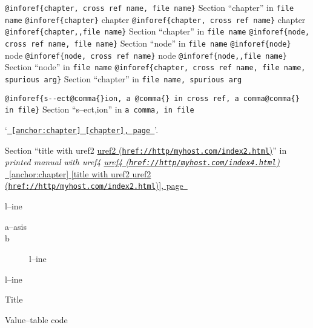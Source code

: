 \documentclass{book}
\begin{document}
\begin{titlepage}
\texttt{@inforef\{chapter, cross ref name, file name\}} Section ``chapter'' in \texttt{file name}
\texttt{@inforef\{chapter\}} chapter
\texttt{@inforef\{chapter, cross ref name\}} chapter
\texttt{@inforef\{chapter,,file name\}} Section ``chapter'' in \texttt{file name}
\texttt{@inforef\{node, cross ref name, file name\}} Section ``node'' in \texttt{file name}
\texttt{@inforef\{node\}} node
\texttt{@inforef\{node, cross ref name\}} node
\texttt{@inforef\{node,,file name\}} Section ``node'' in \texttt{file name}
\texttt{@inforef\{chapter, cross ref name, file name, spurious arg\}} Section ``chapter'' in \texttt{file name, spurious arg}

\texttt{@inforef\{s{-}{-}ect@comma\{\}ion, a @comma\{\} in cross
ref, a comma@comma\{\} in file\}}
Section ``s--ect,ion'' in \texttt{a comma, in file}

`\texttt{\hyperref[anchor:chapter]{\chaptername~\ref*{anchor:chapter} [chapter], page~\pageref*{anchor:chapter}}}'.

Section ``title with uref2 \href{href://http/myhost.com/index2.html}{uref2 (\nolinkurl{href://http/myhost.com/index2.html})}'' in \textit{printed manual with uref4 \href{href://http/myhost.com/index4.html}{uref4 (\nolinkurl{href://http/myhost.com/index4.html})}}
\hyperref[anchor:chapter]{\chaptername~\ref*{anchor:chapter} [title with uref2 \href{href://http/myhost.com/index2.html}{uref2 (\nolinkurl{href://http/myhost.com/index2.html})}], page~\pageref*{anchor:chapter}}

\begin{description}[format=\textbf]
\item[a--strong]
l--ine
\end{description}

\begin{description}
\item[a--asis]
%
\item[b]
%
l--ine
\end{description}

\begin{description}[format=\normalfont\emph]
\item[a]
%
%
\item[b]
%
l--ine
\end{description}

\begin{description}[format=\texttt]
\item[] Title
\item[a{-}{-}code]
Value--table code
\end{description}


\end{titlepage}
\end{document}
